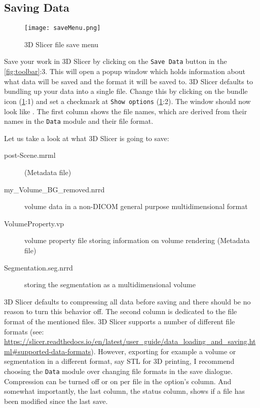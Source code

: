 \subsection{Saving Data}
\begin{figure}[h!]
	\centerline{
		\texttt{[image: saveMenu.png]}}
	\caption{3D Slicer file save menu}\label{fig:save}
\end{figure}
\noindent
Save your work in 3D Slicer by clicking on the \texttt{Save Data} button in the \cref{fig:toolbar}:3.
This will open a popup window which holds information about what data will be saved and the format it will be saved to.
3D Slicer defaults to bundling up your data into a single file. Change this by clicking on the bundle icon (\cref{fig:save}:1) and set a checkmark at \texttt{Show options} (\cref{fig:save}:2).
The window should now look like .
The first column shows the file names, which are derived from their names in the \texttt{Data} module and their file format.

Let us take a look at what 3D Slicer is going to save:

\begin{description}
	\item [post-Scene.mrml] \cite{kikinis3DSlicerPlatform2014} (Metadata file)
	\item [my\_Volume\_BG\_removed.nrrd] volume data in a non-DICOM general purpose multidimensional format
	\item [VolumeProperty.vp] volume property file storing information on volume rendering (Metadata file)
	\item [Segmentation.seg.nrrd] \cite{kikinis3DSlicerPlatform2014} storing the segmentation as a multidimensional volume
\end{description}

3D Slicer defaults to compressing all data before saving and there should be no reason to turn this behavior off.
\noindent
The second column is dedicated to the file format of the mentioned files.
3D Slicer supports a number of different file formats (see: \url{https://slicer.readthedocs.io/en/latest/user_guide/data_loading_and_saving.html#supported-data-formats}).
However, exporting for example a volume or segmentation in a different format, say STL for 3D printing, I recommend choosing the \texttt{Data} module over changing file formats in the save dialogue.
Compression can be turned off or on per file in the option's column.
And somewhat importantly, the last column, the status column, shows if a file has been modified since the last save.

